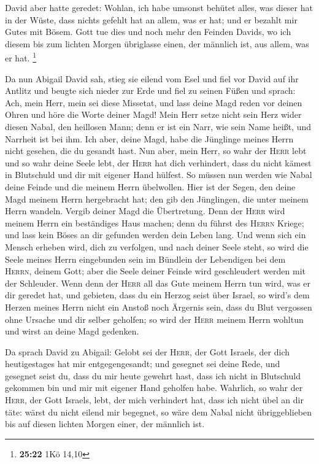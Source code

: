  David aber hatte geredet: Wohlan, ich habe umsonst
behütet alles, was dieser hat in der Wüste, dass nichts gefehlt hat an
allem, was er hat; und er bezahlt mir Gutes mit Bösem. 
Gott tue dies und noch mehr den Feinden Davids, wo ich diesem bis zum
lichten Morgen übriglasse einen, der männlich ist, aus allem, was er
hat. \footnote{\textbf{25:22} 1Kö 14,10}

 Da nun Abigail David sah, stieg sie eilend vom Esel und
fiel vor David auf ihr Antlitz und beugte sich nieder zur Erde
 und fiel zu seinen Füßen und sprach: Ach, mein Herr,
mein sei diese Missetat, und lass deine Magd reden vor deinen Ohren und
höre die Worte deiner Magd!  Mein Herr setze nicht sein
Herz wider diesen Nabal, den heillosen Mann; denn er ist ein Narr, wie
sein Name heißt, und Narrheit ist bei ihm. Ich aber, deine Magd, habe
die Jünglinge meines Herrn nicht gesehen, die du gesandt hast.
 Nun aber, mein Herr, so wahr der \textsc{Herr} lebt und
so wahr deine Seele lebt, der \textsc{Herr} hat dich verhindert, dass du
nicht kämest in Blutschuld und dir mit eigener Hand hülfest. So müssen
nun werden wie Nabal deine Feinde und die meinem Herrn übelwollen.
 Hier ist der Segen, den deine Magd meinem Herrn
hergebracht hat; den gib den Jünglingen, die unter meinem Herrn wandeln.
 Vergib deiner Magd die Übertretung. Denn der
\textsc{Herr} wird meinem Herrn ein beständiges Haus machen; denn du
führst des \textsc{Herrn} Kriege; und lass kein Böses an dir gefunden
werden dein Leben lang.  Und wenn sich ein Mensch erheben
wird, dich zu verfolgen, und nach deiner Seele steht, so wird die Seele
meines Herrn eingebunden sein im Bündlein der Lebendigen bei dem
\textsc{Herrn}, deinem Gott; aber die Seele deiner Feinde wird
geschleudert werden mit der Schleuder.  Wenn denn der
\textsc{Herr} all das Gute meinem Herrn tun wird, was er dir geredet
hat, und gebieten, dass du ein Herzog seist über Israel, 
so wird's dem Herzen meines Herrn nicht ein Anstoß noch Ärgernis sein,
dass du Blut vergossen ohne Ursache und dir selber geholfen; so wird der
\textsc{Herr} meinem Herrn wohltun und wirst an deine Magd gedenken.

 Da sprach David zu Abigail: Gelobt sei der
\textsc{Herr}, der Gott Israels, der dich heutigestages hat mir
entgegengesandt;  und gesegnet sei deine Rede, und
gesegnet seist du, dass du mir heute gewehrt hast, dass ich nicht in
Blutschuld gekommen bin und mir mit eigener Hand geholfen habe.
 Wahrlich, so wahr der \textsc{Herr}, der Gott Israels,
lebt, der mich verhindert hat, dass ich nicht übel an dir täte: wärst du
nicht eilend mir begegnet, so wäre dem Nabal nicht übriggeblieben bis
auf diesen lichten Morgen einer, der männlich ist.

